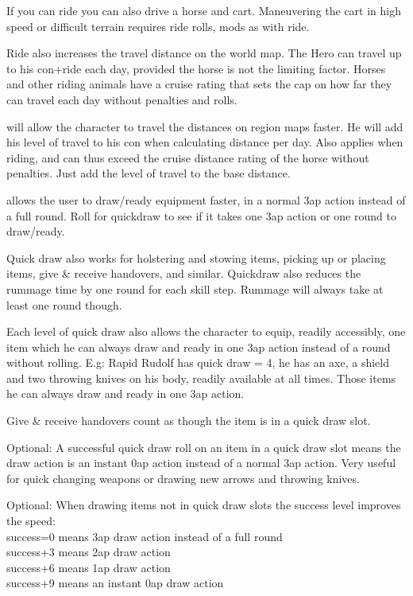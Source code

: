 If you can ride you can also drive a horse and cart. Maneuvering the cart in high speed or difficult terrain requires ride rolls, mods as with ride.

Ride also increases the travel distance on the world map. The Hero can travel up to his con+ride each day, provided the horse is not the limiting factor. Horses and other riding animals have a cruise rating that sets the cap on how far they can travel each day without penalties and rolls.


 will allow the character to travel the distances on region maps faster. He will add his level of travel to his con when calculating distance per day. Also applies when riding, and can thus exceed the cruise distance rating of the horse without penalties. Just add the level of travel to the base distance.


 allows the user to draw/ready equipment faster, in a normal 3ap action instead of a full round. Roll for quickdraw to see if it takes one 3ap action or one round to draw/ready. 

Quick draw also works for holstering and stowing items, picking up or placing items, give \& receive handovers, and similar.
Quickdraw also reduces the rummage time by one round for each skill step. Rummage will always take at least one round though.

Each level of quick draw also allows the character to equip, readily accessibly, one item which he can always draw and ready in one 3ap action instead of a round without rolling.
E.g: Rapid Rudolf has quick draw = 4, he has an axe, a shield and two throwing knives on his body, readily available at all times. Those items he can always draw and ready in one 3ap action.

Give \& receive handovers count as though the item is in a quick draw slot.

Optional: A successful quick draw roll on an item in a quick draw slot means the draw action is an instant 0ap action instead of a normal 3ap action. Very useful for quick changing weapons or drawing new arrows and throwing knives.

Optional: When drawing items not in quick draw slots the success level improves the speed:\\
success=0 means 3ap draw action instead of a full round\\
success+3 means 2ap draw action\\
success+6 means 1ap draw action\\
success+9 means an instant 0ap draw action


